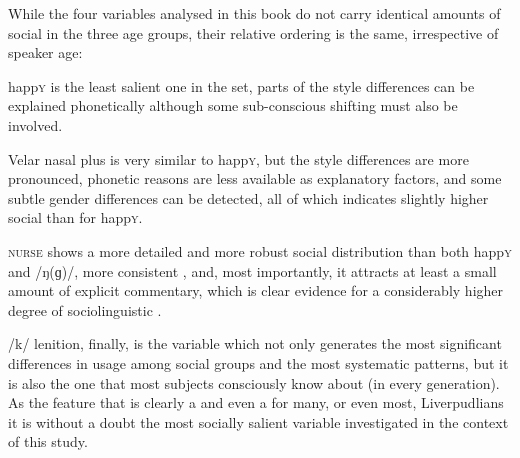 While the four variables analysed in this book do not carry identical amounts of social  in the three age groups, their relative ordering is the same, irrespective of speaker age:
\begin{inparaenum}[(1)]
	\item happ\textsc{y} is the least salient one in the set, parts of the style differences can be explained phonetically although some sub-conscious shifting must also be involved.
	\item Velar nasal plus is very similar to happ\textsc{y}, but the style differences are more pronounced, phonetic reasons are less available as explanatory factors, and some subtle gender differences can be detected, all of which indicates slightly higher social  than for happ\textsc{y}.
	\item \textsc{nurse} shows a more detailed and more robust social distribution than both happ\textsc{y} and /ŋ(ɡ)/, more consistent , and, most importantly, it attracts at least a small amount of explicit commentary, which is clear evidence for a considerably higher degree of sociolinguistic .
	\item /k/ lenition, finally, is the variable which not only generates the most significant differences in usage among social groups and the most systematic  patterns, but it is also the one that most subjects consciously know about (in every generation).
	As the feature that is clearly a  and even a  for many, or even most, Liverpudlians it is without a doubt the most socially salient variable investigated in the context of this study.
\end{inparaenum}